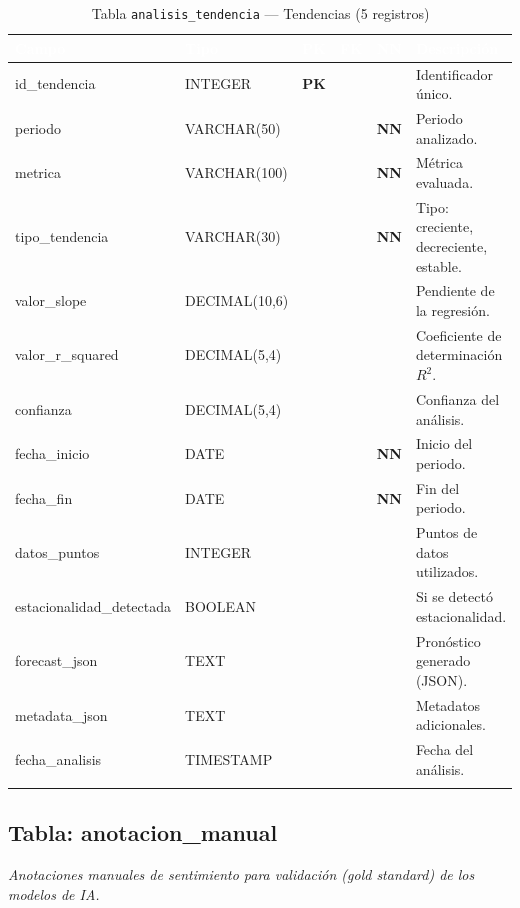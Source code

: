 \documentclass[11pt,a4paper]{article}
\newcommand{\tableheadrow}{\rowcolor{tableheader}}
\newcommand{\tablehead}[1]{\textcolor{white}{\textbf{#1}}}
\newcommand{\pk}{\textcolor{emiblue}{\textbf{PK}}}
\newcommand{\nn}{\textcolor{red!70!black}{\textbf{NN}}}
\begin{document}
\begin{longtable}{p{4.2cm} p{2.8cm} c c c p{4.5cm}}
\toprule
\tableheadrow
\tablehead{Campo} & \tablehead{Tipo} & \tablehead{PK} & \tablehead{FK} & \tablehead{NN} & \tablehead{Descripción} \\
\midrule
\endhead
id\_tendencia & INTEGER & \pk & & & Identificador único. \\
\rowcolor{tablerow}
periodo & VARCHAR(50) & & & \nn & Periodo analizado. \\
metrica & VARCHAR(100) & & & \nn & Métrica evaluada. \\
\rowcolor{tablerow}
tipo\_tendencia & VARCHAR(30) & & & \nn & Tipo: creciente, decreciente, estable. \\
valor\_slope & DECIMAL(10,6) & & & & Pendiente de la regresión. \\
\rowcolor{tablerow}
valor\_r\_squared & DECIMAL(5,4) & & & & Coeficiente de determinación $R^2$. \\
confianza & DECIMAL(5,4) & & & & Confianza del análisis. \\
\rowcolor{tablerow}
fecha\_inicio & DATE & & & \nn & Inicio del periodo. \\
fecha\_fin & DATE & & & \nn & Fin del periodo. \\
\rowcolor{tablerow}
datos\_puntos & INTEGER & & & & Puntos de datos utilizados. \\
estacionalidad\_detectada & BOOLEAN & & & & Si se detectó estacionalidad. \\
\rowcolor{tablerow}
forecast\_json & TEXT & & & & Pronóstico generado (JSON). \\
metadata\_json & TEXT & & & & Metadatos adicionales. \\
\rowcolor{tablerow}
fecha\_analisis & TIMESTAMP & & & & Fecha del análisis. \\
\bottomrule
\caption{Tabla \texttt{analisis\_tendencia} — Tendencias (5 registros)}
\end{longtable}

\subsection{Tabla: anotacion\_manual}
\textit{Anotaciones manuales de sentimiento para validación (gold standard) de los modelos de IA.}
\end{document}
